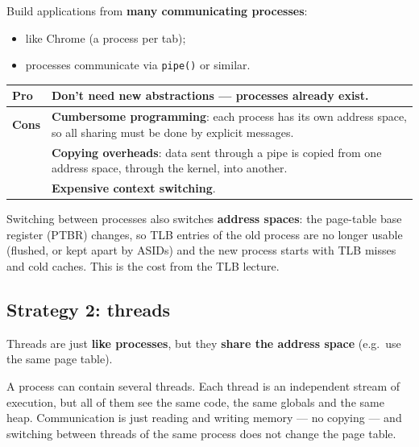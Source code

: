 \documentclass[11pt,a4paper]{article}
\begin{document}
Build applications from \textbf{many communicating processes}:
\begin{itemize}
  \item like Chrome (a process per tab);
  \item processes communicate via \texttt{pipe()} or similar.
\end{itemize}

\begin{center}
\renewcommand{\arraystretch}{1.2}
\begin{tabularx}{\textwidth}{@{}lX@{}}
  \toprule
  \textbf{Pro} & Don't need new abstractions --- processes already exist. \\
  \midrule
  \textbf{Cons} & \textbf{Cumbersome programming}: each process has its own
                  address space, so all sharing must be done by explicit
                  messages. \\
                & \textbf{Copying overheads}: data sent through a pipe is
                  copied from one address space, through the kernel, into
                  another. \\
                & \textbf{Expensive context switching}. \\
  \bottomrule
\end{tabularx}
\end{center}

\begin{keybox}
Switching between processes also switches \textbf{address spaces}: the
page-table base register (PTBR) changes, so TLB entries of the old process
are no longer usable (flushed, or kept apart by ASIDs) and the new
process starts with TLB misses and cold caches. This is the cost from the
TLB lecture.
\end{keybox}

\subsection{Strategy 2: threads}

\begin{defbox}
Threads are just \textbf{like processes}, but they \textbf{share the
address space} (e.g.\ use the same page table).
\end{defbox}

A process can contain several threads. Each thread is an independent
stream of execution, but all of them see the same code, the same globals
and the same heap. Communication is just reading and writing memory --- no
copying --- and switching between threads of the same process does not
change the page table.
\end{document}
